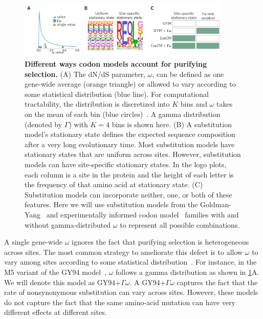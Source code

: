 \documentclass[11pt]{article}
\begin{document}
\begin{figure}
\centerline{\includegraphics[width=0.90\textwidth]{figures/model_feature.pdf}}
\caption{\label{fig:model_feature}
\textbf{Different ways codon models account for purifying selection.}
(A) The dN/dS parameter, $\omega$, can be defined as one gene-wide average (orange triangle) or allowed to vary according to some statistical distribution (blue line). 
For computational tractability, the distribution is discretized into $K$ bins and $\omega$ takes on the mean of each bin (blue circles)~\citep{yang1994maximum,yang2000codon}. 
A gamma distribution (denoted by $\Gamma$) with $K=4$ bins is shown here.
(B) A substitution model's stationary state defines the expected sequence composition after a very long evolutionary time. 
Most substitution models have stationary states that are uniform across sites.
However, substitution models can have site-specific stationary states.
In the logo plots, each column is a site in the protein and the height of each letter is the frequency of that amino acid at stationary state. 
(C) Substitution models can incorporate neither, one, or both of these features.
Here we will use substitution models from the Goldman-Yang~\citep[GY94;][]{goldman1994codon,yang2000codon} and experimentally informed codon model~\citep[ExpCM;][]{hilton2017phydms} families with and without gamma-distributed $\omega$ to represent all possible combinations.
}
\end{figure}

A single gene-wide $\omega$ ignores the fact that purifying selection is heterogeneous across sites.
The most common strategy to ameliorate this defect is to allow $\omega$ to vary among sites according to some statistical distribution~\citep{yang1994maximum,yang2000codon}.
For instance, in the M5 variant of the GY94 model~\citep{yang2000codon}, $\omega$ follows a gamma distribution as shown in \ref{fig:model_feature}A.
We will denote this model as GY94+$\Gamma\omega$.
A GY94+$\Gamma\omega$ captures the fact that the rate of nonsynonymous substitution can vary across sites. 
However, these models do not capture the fact that the same amino-acid mutation can have very different effects at different sites. 
\end{document}
